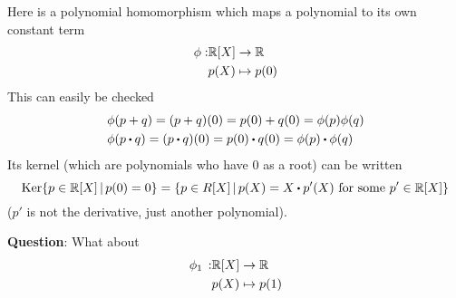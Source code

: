 \documentclass[../Main.tex]{subfiles}
\begin{document}
\begin{example}
	Here is a polynomial homomorphism which maps a polynomial to its own constant term
	\begin{align*}
		\phi: &\mathbb{R}[X] \to \mathbb{R} \\
		&p(X) \mapsto p(0)
	\end{align*}
	This can easily be checked
	\begin{align*}
		&\phi(p+q) = (p+q)(0)=p(0)+q(0)=\phi(p)\phi(q)\\
		&\phi(p\rdot q)=(p\rdot q)(0)=p(0)\rdot q(0)=\phi(p)\rdot \phi(q)
	\end{align*}
	Its kernel (which are polynomials who have $0$ as a root) can be written
	\[\Ker \{p\in \R[X]\,|\,p(0)=0\} = \{p\in R[X]\,|\,p(X) = X\rdot p'(X) \text{ for some } p'\in \R[X]\}\]
	($p'$ is not the derivative, just another polynomial).
\end{example}
\textbf{Question}: What about
\begin{align*}
	\phi_1 \,: &\mathbb{R}[X] \to \mathbb{R}\\
	&p(X) \mapsto p(1)
\end{align*}
\end{document}
